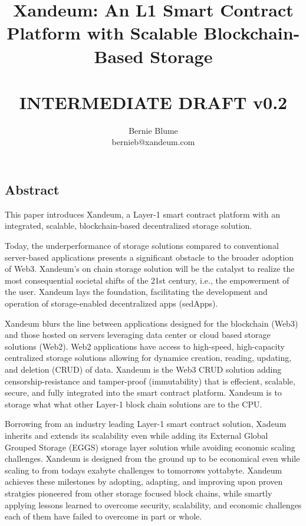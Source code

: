 \documentclass[11pt]{article}   	%
\title{%
Xandeum: An L1 Smart Contract Platform with Scalable Blockchain-Based Storage \\
\ \\
\large INTERMEDIATE DRAFT v0.2}
\author{
{\rm Bernie Blume}\\
bernieb@xandeum.com
}
\begin{document}
\maketitle

\maketitle

\subsection*{Abstract}
This paper introduces Xandeum, a Layer-1 smart contract platform with an integrated, scalable, blockchain-based decentralized storage solution.

Today, the underperformance of storage solutions compared to conventional server-based applications presents a significant obstacle to the broader adoption of Web3. Xandeum's on chain storage solution will be the catalyst to realize the most consequential societal shifts of the 21st century, i.e., the empowerment of the user. Xandeum lays the foundation, facilitating the development and operation of storage-enabled decentralized apps (sedApps).

Xandeum blurs the line between applications designed for the blockchain (Web3) and those hosted on servers leveraging data center or cloud based storage solutions (Web2). Web2 applications have access to high-speed, high-capacity centralized storage solutions allowing for dynamice creation, reading, updating, and deletion (CRUD) of data. Xandeum is the Web3 CRUD solution adding censorship-resistance and tamper-proof (immutability) that is effecient, scalable, secure, and fully integrated into the smart contract platform. Xandeum is to storage what what other Layer-1 block chain solutions are to the CPU.

Borrowing from an industry leading Layer-1 smart contract solution, Xadeum inherits and extends its scalability even while adding its External Global Grouped Storage (EGGS) storage layer solution while avoiding economic scaling challenges. Xandeum is designed from the ground up to be economical even while scaling to from todays exabyte challenges to tomorrows yottabyte. Xandeum achieves these milestones by adopting, adapting, and improving upon proven stratgies pioneered from other storage focused block chains, while smartly applying lessons learned to overcome security, scalability, and economic challenges each of them have failed to overcome in part or whole.
\end{document}

